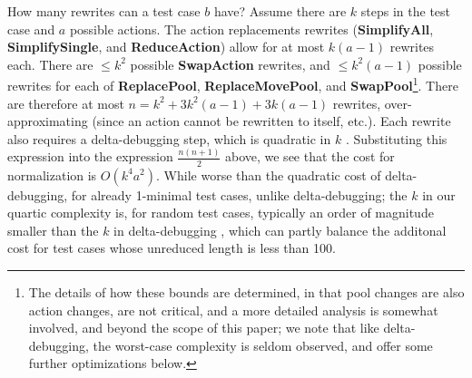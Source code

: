 How many rewrites can a test case $b$ have?  Assume there are $k$
steps in the test case and $a$ possible actions.  The action
replacements rewrites ({\bf SimplifyAll}, {\bf SimplifySingle}, and
{\bf ReduceAction}) allow for at most $k (a-1)$ rewrites each.  There
are $\leq k^2$ possible {\bf SwapAction} rewrites, and $\leq k^2(a-1)$
possible rewrites for each of {\bf ReplacePool}, {\bf
  ReplaceMovePool}, and {\bf SwapPool}\footnote{The details of how
  these bounds are determined, in that pool changes are also action
  changes, are not critical, and a more detailed analysis is somewhat
  involved, and beyond the scope of this paper; we note that like
  delta-debugging, the worst-case complexity is seldom observed, and
  offer some further optimizations below.}.  There are therefore at
most $n=k^2 + 3k^2(a-1) + 3k(a-1)$ rewrites, over-approximating (since
an action cannot be rewritten to itself, etc.).  Each rewrite also
requires a delta-debugging step, which is quadratic in $k$ \cite{DD}.
Substituting this expression into the expression $\frac{n(n+1)}{2}$
above, we see that the cost for normalization is $O(k^4a^2)$.  While
worse than the quadratic cost of delta-debugging, for already
1-minimal test cases, unlike delta-debugging; the $k$ in our quartic complexity
is, for random test cases, typically an order of magnitude smaller
than the $k$ in delta-debugging \cite{ICSEDiff,icst2014,MinUnit},
which can partly balance the additonal cost for test cases whose
unreduced length is less than 100.


